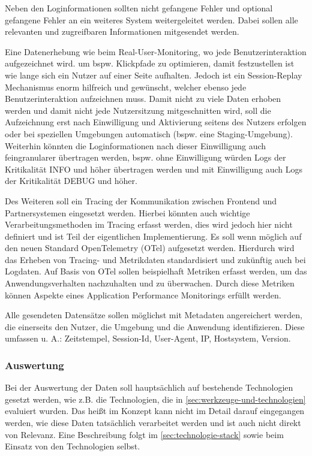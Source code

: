 	Neben den Loginformationen sollten nicht gefangene Fehler und optional gefangene Fehler an ein weiteres System weitergeleitet werden. Dabei sollen alle relevanten und zugreifbaren Informationen mitgesendet werden.
		
	Eine Datenerhebung wie beim Real-User-Monitoring, wo jede Benutzerinteraktion aufgezeichnet wird. um bspw. Klickpfade zu optimieren, damit festzustellen ist wie lange sich ein Nutzer auf einer Seite aufhalten. Jedoch ist ein Session-Replay Mechanismus enorm hilfreich und gewünscht, welcher ebenso jede Benutzerinteraktion aufzeichnen muss. Damit nicht zu viele Daten erhoben werden und damit nicht jede Nutzersitzung mitgeschnitten wird, soll die Aufzeichnung erst nach Einwilligung und Aktivierung seitens des Nutzers erfolgen oder bei speziellen Umgebungen automatisch (bspw. eine Staging-Umgebung). Weiterhin könnten die Loginformationen nach dieser Einwilligung auch feingranularer übertragen werden, bspw. ohne Einwilligung würden Logs der Kritikalität INFO und höher übertragen werden und mit Einwilligung auch Logs der Kritikalität DEBUG und höher.
		
	Des Weiteren soll ein Tracing der Kommunikation zwischen Frontend und Partnersystemen eingesetzt werden. Hierbei könnten auch wichtige Verarbeitungsmethoden im Tracing erfasst werden, dies wird jedoch hier nicht definiert und ist Teil der eigentlichen Implementierung. Es soll wenn möglich auf den neuen Standard OpenTelemetry (OTel) aufgesetzt werden. Hierdurch wird das Erheben von Tracing- und Metrikdaten standardisiert und zukünftig auch bei Logdaten. Auf Basis von OTel sollen beispielhaft Metriken erfasst werden, um das Anwendungsverhalten nachzuhalten und zu überwachen. Durch diese Metriken können Aspekte eines Application Performance Monitorings erfüllt werden.
		
	Alle gesendeten Datensätze sollen möglichst mit Metadaten angereichert werden, die einerseits den Nutzer, die Umgebung und die Anwendung identifizieren. Diese umfassen u. A.: Zeitstempel, Session-Id, User-Agent, IP, Hostsystem, Version.
		
	\subsubsection{Auswertung}
		
	Bei der Auswertung der Daten soll hauptsächlich auf bestehende Technologien gesetzt werden, wie z.B. die Technologien, die in \autoref{sec:werkzeuge-und-technologien} evaluiert wurden. Das heißt im Konzept kann nicht im Detail darauf eingegangen werden, wie diese Daten tatsächlich verarbeitet werden und ist auch nicht direkt von Relevanz. Eine Beschreibung folgt im \autoref{sec:technologie-stack} sowie beim Einsatz von den Technologien selbst.
		
